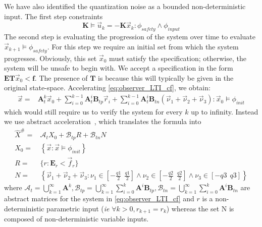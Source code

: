 \documentclass[runningheads,a4paper]{llncs}
\newcommand{\mat}[1]{\boldsymbol{#1}}
\begin{document}
We have also identified 
the quantization noise as a bounded non-deterministic input.
%
The first step constraints
\begin{equation}
\mat{K} \models \vec{u}_k=-\mat{K}\vec{x}_k : \phi_{safety} \wedge \phi_{input}
\label{eq:of_bounds}
\end{equation}
The second step is evaluating the progression of the system over time to evaluate 
$\vec{x}_{k+1} \models \phi_{safety}$. For this step we require 
an initial set from which the system progresses. Obviously, this set $\vec{x}_0$ 
must satisfy the specification; otherwise, the system will be unsafe to begin with.
We accept a specification in the form $\mat{E}\mat{T}\vec{x}_0<\mat{f}$. 
The presence of $\mat{T}$ is because this will typically be given in the original 
state-space. Accelerating \eqref{eq:observer_LTI_cf}, we obtain:
%
\begin{align}
\label{eq:acc_observer_LTI_cf}
\vec{x}=&\mat{A}_t^k\vec{x}_0
+\sum_{i=0}^{k-1} \mat{A}_t^i \mat{B}_{tp} \vec{r}_i
+\sum_{i=0}^{k-1} \mat{A}_t^i \mat{B}_{tn}(\vec{\nu}_1+\vec{\nu}_2+\vec{\nu}_3) : \vec{x}_0 \models \phi_{init}
\end{align}
which would still require us to verify the system for every $k$ up to infinity. 
Instead we use abstract acceleration~\cite{cattaruzza2015unbounded}, which translates the formula into
%
\begin{align}
\label{eq:aa_observer_LTI_cf}
\hat{X}^\#
=&\mathcal{A}_t X_0+\mathcal{B}_{tp} R + \mathcal{B}_{tn} N\\
X_0 =&\left \{\vec{x} : \vec{x} \models \phi_{init} \right\}\nonumber\\
 R =&\{r : \mat{E}_r < \vec{f}_r \}\nonumber\\
 N=&\left \{ \vec{\nu}_1+\vec{\nu}_2+ \vec{\nu}_3 : \nu_1 \in \left[-\frac{q1}{2}\ \ \frac{q1}{2}\right] \wedge \nu_2 \in \left[-\frac{q2}{2}\ \ \frac{q2}{2}\right]  \wedge \nu_3 \in \left[-q3\ \ q3\right]  \right \}\nonumber
\end{align}
%
where $\mathcal{A}_t=\bigcup_{k=1}^\infty \mat{A}^k, \mathcal{B}_{tp}=\bigcup_{k=1}^\infty \sum_{i=0}^k\mat{A}^i\mat{B}_{tp}, \mathcal{B}_{tn}=\bigcup_{k=1}^\infty \sum_{i=0}^k\mat{A}^i\mat{B}_{tn}$ are abstract matrices for the system in \eqref{eq:observer_LTI_cf} and $r$ is a non-deterministic parametric input (\emph{ie} $\forall k>0, r_{k+1} =r_k$) whereas the set N is composed of non-deterministic variable inputs.


\end{document}
